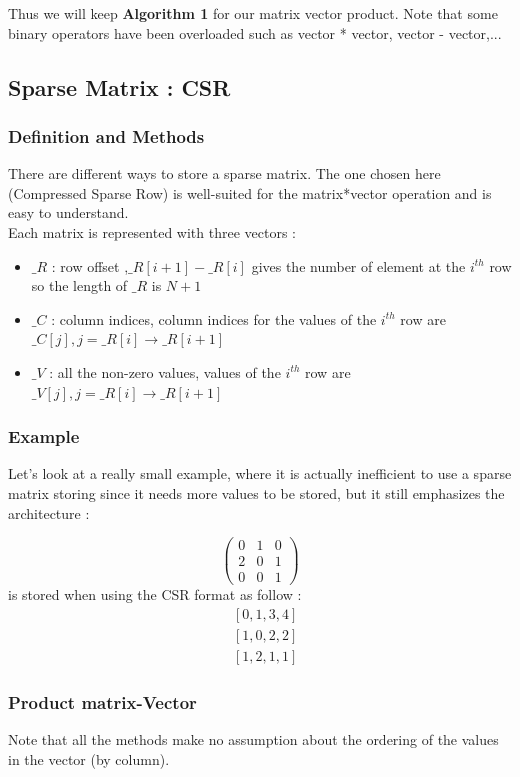 \documentclass[a4paper]{report}
\begin{document}
Thus we will keep \textbf{ Algorithm 1} for our matrix vector product.
Note that some binary operators have been overloaded such as vector * vector, vector - vector,...

\subsection{Sparse Matrix : CSR}
\subsubsection{Definition and Methods}
There are different ways to store a sparse matrix. The one chosen here (Compressed Sparse Row) is well-suited for the matrix*vector operation and is easy to understand.\\
Each matrix is represented with three vectors :
\begin{itemize}
\item $\_R$ : row offset ,$\_R[i+1]-\_R[i]$ gives the number of element at the $i^{th}$ row so the length of $\_R$ is $N+1$
\item $\_C$ : column indices, column indices for the values of the $i^{th}$ row are $\_C[j],j =\_R[i] \rightarrow \_R[i+1]$
\item $\_V$ : all the non-zero values, values of the $i^{th}$ row are $\_V[j],j=\_R[i] \rightarrow \_R[i+1]$
\end{itemize}



\subsubsection{Example}
Let's look at a really small example, where it is actually inefficient to use a sparse matrix storing since it needs more values to be stored, but it still emphasizes the architecture :

\[
\left(
\begin{matrix}
0&1&0\\
2&0&1\\
0&0&1
\end{matrix}
\right)
\]
is stored when using the CSR format as follow :
\begin{align*}
&[0,1,3,4]\\
&[1,0,2,2]\\
&[1,2,1,1]
\end{align*}

\subsubsection{Product matrix-Vector}
Note that all the methods make no assumption about the ordering of the values in the vector (by column).
\end{document}
